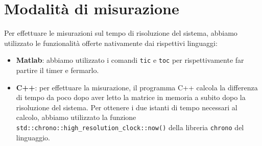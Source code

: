\section{Modalità di misurazione}
Per effettuare le misurazioni sul tempo di risoluzione del sistema, abbiamo utilizzato le funzionalità offerte nativamente dai
rispettivi linguaggi:
\begin{itemize}
    \item \textbf{Matlab}: abbiamo utilizzato i comandi \texttt{tic} e \texttt{toc} per rispettivamente far partire il timer
    e fermarlo.
    \item \textbf{C++}: per effettuare la misurazione, il programma C++ calcola la differenza di tempo da poco dopo aver letto la matrice in memoria
    a subito dopo la risoluzione del sistema. Per ottenere i due istanti di tempo necessari al calcolo, abbiamo utilizzato la funzione \texttt{std::chrono::high\_resolution\_clock::now()}
    della libreria \texttt{chrono} del linguaggio.
\end{itemize}


\clearpage

